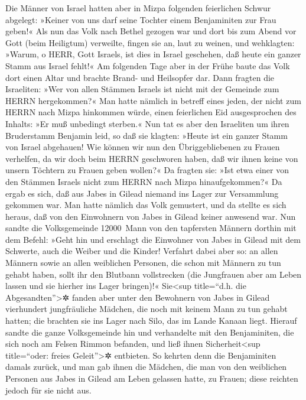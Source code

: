 Die Männer von Israel hatten aber in Mizpa folgenden
feierlichen Schwur abgelegt: »Keiner von uns darf seine Tochter einem
Benjaminiten zur Frau geben!« Als nun das Volk nach Bethel
gezogen war und dort bis zum Abend vor Gott (beim Heiligtum) verweilte,
fingen sie an, laut zu weinen, und wehklagten: »Warum, o
HERR, Gott Israels, ist dies in Israel geschehen, daß heute ein ganzer
Stamm aus Israel fehlt!« Am folgenden Tage aber in der
Frühe baute das Volk dort einen Altar und brachte Brand- und Heilsopfer
dar. Dann fragten die Israeliten: »Wer von allen Stämmen
Israels ist nicht mit der Gemeinde zum HERRN hergekommen?« Man hatte
nämlich in betreff eines jeden, der nicht zum HERRN nach Mizpa hinkommen
würde, einen feierlichen Eid ausgesprochen des Inhalts: »Er muß
unbedingt sterben.« Nun tat es aber den Israeliten um
ihren Bruderstamm Benjamin leid, so daß sie klagten: »Heute ist ein
ganzer Stamm von Israel abgehauen! Wie können wir nun den
Übriggebliebenen zu Frauen verhelfen, da wir doch beim HERRN geschworen
haben, daß wir ihnen keine von unsern Töchtern zu Frauen geben wollen?«
Da fragten sie: »Ist etwa einer von den Stämmen Israels
nicht zum HERRN nach Mizpa hinaufgekommen?« Da ergab es sich, daß aus
Jabes in Gilead niemand ins Lager zur Versammlung gekommen war.
Man hatte nämlich das Volk gemustert, und da stellte es
sich heraus, daß von den Einwohnern von Jabes in Gilead keiner anwesend
war. Nun sandte die Volksgemeinde 12000~Mann von den
tapfersten Männern dorthin mit dem Befehl: »Geht hin und erschlagt die
Einwohner von Jabes in Gilead mit dem Schwerte, auch die Weiber und die
Kinder! Verfahrt dabei aber so: an allen Männern sowie an
allen weiblichen Personen, die schon mit Männern zu tun gehabt haben,
sollt ihr den Blutbann vollstrecken (die Jungfrauen aber am Leben lassen
und sie hierher ins Lager bringen)!« Sie\textless sup
title=``d.h. die Abgesandten''\textgreater✲ fanden aber unter den
Bewohnern von Jabes in Gilead vierhundert jungfräuliche Mädchen, die
noch mit keinem Mann zu tun gehabt hatten; die brachten sie ins Lager
nach Silo, das im Lande Kanaan liegt. Hierauf sandte die
ganze Volksgemeinde hin und verhandelte mit den Benjaminiten, die sich
noch am Felsen Rimmon befanden, und ließ ihnen Sicherheit\textless sup
title=``oder: freies Geleit''\textgreater✲ entbieten. So
kehrten denn die Benjaminiten damals zurück, und man gab ihnen die
Mädchen, die man von den weiblichen Personen aus Jabes in Gilead am
Leben gelassen hatte, zu Frauen; diese reichten jedoch für sie nicht
aus.

